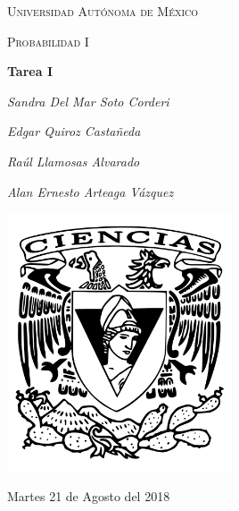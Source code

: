 \documentclass[12pt,a4paper]{report}
\begin{document}
\begin{titlepage}
	\centering
	{\scshape\LARGE Universidad Autónoma de México \par}
	\vspace{1cm}
	{\scshape\Large Probabilidad I\par}
	\vspace{1.5cm}
	{\huge\bfseries Tarea I\par}
	\vspace{.5cm}
	{\Large\itshape Sandra Del Mar Soto Corderi \par}
	\vspace{.5cm}
	{\Large\itshape Edgar Quiroz Castañeda \par}
    \vspace{.5cm}
	{\Large\itshape Raúl Llamosas Alvarado \par}
	 \vspace{.5cm}
	{\Large\itshape Alan Ernesto Arteaga Vázquez \par}
	\vfill
	 \includegraphics[width=0.5\textwidth]{escudo.png}
	\vfill

	{\large Martes 21 de Agosto del 2018 \par}
\end{titlepage}

\pagebreak
\setlength{\voffset}{-0.75in}
\setlength{\headsep}{5pt}
\end{document}
